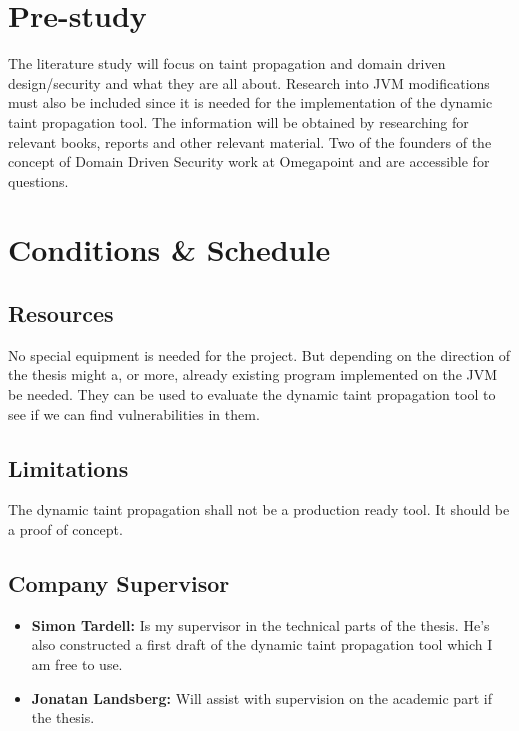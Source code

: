 \documentclass{../kththesis}
\begin{document}
\chapter{Pre-study}
The literature study will focus on taint propagation and domain driven design/security and what they are all about. Research into JVM modifications must also be included since it is needed for the implementation of the dynamic taint propagation tool. The information will be obtained by researching for relevant books, reports and other relevant material. Two of the founders of the concept of Domain Driven Security work at Omegapoint and are accessible for questions.

\chapter{Conditions \& Schedule}
\section{Resources}
No special equipment is needed for the project. But depending on the direction of the thesis might a, or more, already existing program implemented on the JVM be needed. They can be used to evaluate the dynamic taint propagation tool to see if we can find vulnerabilities in them.

\section{Limitations}
The dynamic taint propagation shall not be a production ready tool. It should be a proof of concept.

\section{Company Supervisor}
\begin{itemize}
	\item \textbf{Simon Tardell:} Is my supervisor in the technical parts of the thesis. He's also constructed a first draft of the dynamic taint propagation tool which I am free to use.
	\item \textbf{Jonatan Landsberg:} Will assist with supervision on the academic part if the thesis.
\end{itemize}
\end{document}

